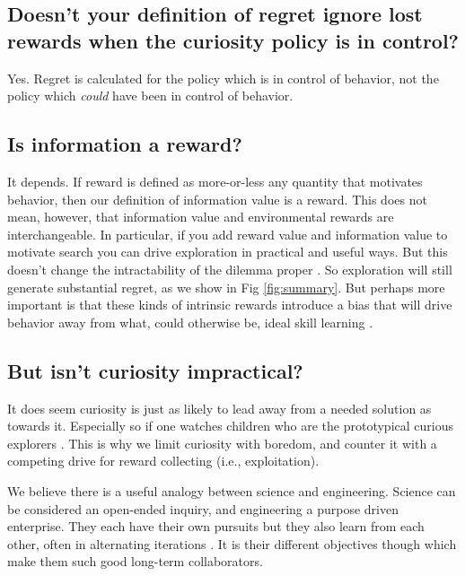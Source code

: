 \subsection{Doesn't your definition of regret ignore lost rewards when the curiosity policy is in control?}
Yes. Regret is calculated for the policy which is in control of behavior, not the policy which \textit{could} have been in control of behavior.


\subsection*{Is information a reward?}
It depends. If reward is defined as more-or-less any quantity that motivates behavior, then our definition of information value is a reward. This does not mean, however, that information value and environmental rewards are interchangeable. In particular, if you add reward value and information value to motivate search you can drive exploration in practical and useful ways. But this doesn't change the intractability of the dilemma proper \citep{Thrun1992a,Dayan1996,Findling2018,Gershman2018b}. So exploration will still generate substantial regret, as we show in Fig \ref{fig:summary}. But perhaps more important is that these kinds of intrinsic rewards \citep{Schmidhuber1991,Berger-Tal2014,Itti2009,Friston2016,Kobayashi2019} introduce a bias that will drive behavior away from what, could otherwise be, ideal skill learning \citep{Ng1999,Simsek2006}.


\subsection*{But isn't curiosity impractical?}
It does seem curiosity is just as likely to lead away from a needed solution as towards it. Especially so if one watches children who are the prototypical curious explorers \citep{Sumner2019,Kidd2015}. This is why we limit curiosity with boredom, and counter it with a competing drive for reward collecting (i.e., exploitation). 

We believe there is a useful analogy between science and engineering. Science can be considered an open-ended inquiry, and engineering a purpose driven enterprise. They each have their own pursuits but they also learn from each other, often in alternating iterations \citep{Gupta2006}. It is their different objectives though which make them such good long-term collaborators.


